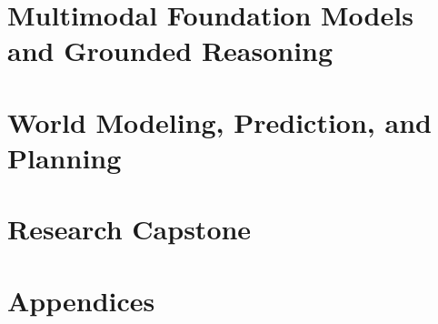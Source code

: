 \documentclass[11pt,openany]{book}
\begin{document}







\part{Multimodal Foundation Models and Grounded Reasoning}








\part{World Modeling, Prediction, and Planning}









\part{Research Capstone}





\appendix
\part{Appendices}










\end{document}

